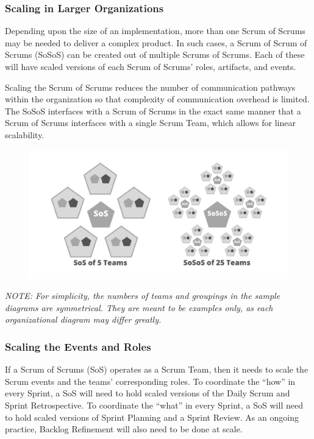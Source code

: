 \documentclass[12pt,a4paper,parskip=full]{scrartcl}
\begin{document}
\subsubsection{Scaling in Larger
Organizations}\label{scaling-in-larger-organizations}

Depending upon the size of an implementation, more than one Scrum of
Scrums may be needed to deliver a complex product. In such cases, a
Scrum of Scrum of Scrums (SoSoS) can be created out of multiple Scrums
of Scrums. Each of these will have scaled versions of each Scrum of
Scrums' roles, artifacts, and events.

Scaling the Scrum of Scrums reduces the number of communication pathways
within the organization so that complexity of communication overhead is
limited. The SoSoS interfaces with a Scrum of Scrums in the exact same
manner that a Scrum of Scrums interfaces with a single Scrum Team, which
allows for linear scalability.

\begin{figure}
    \centering
    \includegraphics[scale=0.15]{2.png}
  
\end{figure}

\emph{NOTE: For simplicity, the numbers of teams and groupings in the
sample diagrams are symmetrical. They are meant to be examples only, as
each organizational diagram may differ greatly.}

\subsubsection{Scaling the Events and
Roles}\label{scaling-the-events-and-roles}

If a Scrum of Scrums (SoS) operates as a Scrum Team, then it needs to
scale the Scrum events and the teams' corresponding roles. To coordinate
the ``how'' in every Sprint, a SoS will need to hold scaled versions of
the Daily Scrum and Sprint Retrospective. To coordinate the ``what'' in
every Sprint, a SoS will need to hold scaled versions of Sprint Planning
and a Sprint Review. As an ongoing practice, Backlog Refinement will
also need to be done at scale.
\end{document}
